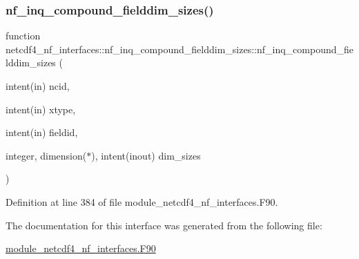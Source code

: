 \subsubsection{\texorpdfstring{nf\+\_\+inq\+\_\+compound\+\_\+fielddim\+\_\+sizes()}{nf\_inq\_compound\_fielddim\_sizes()}}
{\footnotesize\ttfamily function netcdf4\+\_\+nf\+\_\+interfaces\+::nf\+\_\+inq\+\_\+compound\+\_\+fielddim\+\_\+sizes\+::nf\+\_\+inq\+\_\+compound\+\_\+fielddim\+\_\+sizes (\begin{DoxyParamCaption}\item[{intent(in)}]{ncid,  }\item[{intent(in)}]{xtype,  }\item[{intent(in)}]{fieldid,  }\item[{integer, dimension($\ast$), intent(inout)}]{dim\+\_\+sizes }\end{DoxyParamCaption})}



Definition at line 384 of file module\+\_\+netcdf4\+\_\+nf\+\_\+interfaces.\+F90.



The documentation for this interface was generated from the following file\+:\begin{DoxyCompactItemize}
\item 
\hyperlink{module__netcdf4__nf__interfaces_8F90}{module\+\_\+netcdf4\+\_\+nf\+\_\+interfaces.\+F90}\end{DoxyCompactItemize}

